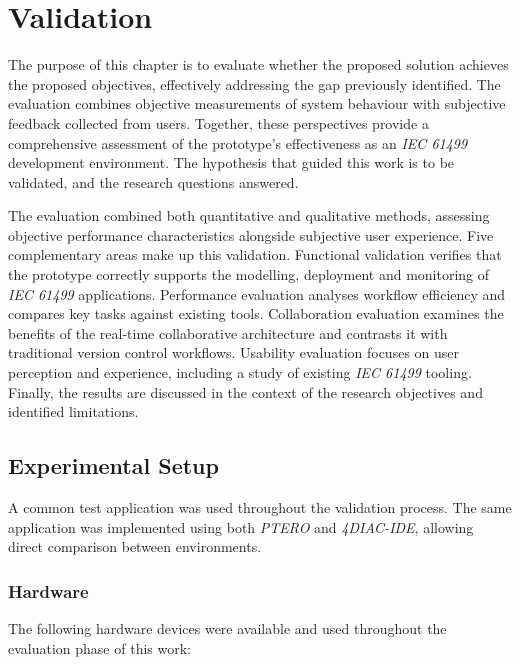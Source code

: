 \chapter{Validation} \label{chap:validation}
The purpose of this chapter is to evaluate whether the proposed solution achieves the proposed objectives, effectively addressing the gap previously identified. The evaluation combines objective measurements of system behaviour with subjective feedback collected from users. Together, these perspectives provide a comprehensive assessment of the prototype's effectiveness as an \textit{IEC 61499} development environment. The hypothesis that guided this work is to be validated, and the research questions answered.

The evaluation combined both quantitative and qualitative methods, assessing objective performance characteristics alongside subjective user experience. Five complementary areas make up this validation. Functional validation verifies that the prototype correctly supports the modelling, deployment and monitoring of \textit{IEC 61499} applications. Performance evaluation analyses workflow efficiency and compares key tasks against existing tools. Collaboration evaluation examines the benefits of the real-time collaborative architecture and contrasts it with traditional version control workflows. Usability evaluation focuses on user perception and experience, including a study of existing \textit{IEC 61499} tooling. Finally, the results are discussed in the context of the research objectives and identified limitations.

\section{Experimental Setup} \label{sec:experimental-setup}
A common test application was used throughout the validation process. The same application was implemented using both \textit{PTERO} and \textit{4DIAC-IDE}, allowing direct comparison between environments.

\subsection{Hardware}
The following hardware devices were available and used throughout the evaluation phase of this work:

